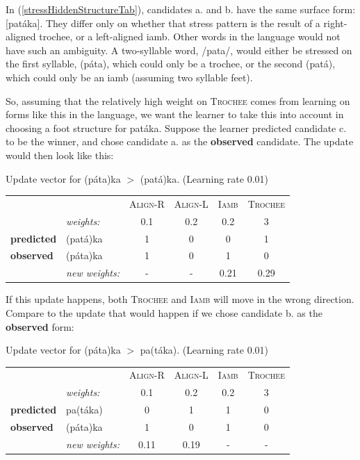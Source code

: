 \documentclass[12]{article}
\begin{document}
	In (\ref{stressHiddenStructureTab}), candidates a. and b. have the same surface form: [pat\'{a}ka].  They differ only on whether that stress pattern is the result of a right-aligned trochee, or a left-aligned iamb.  Other words in the language would not have such an ambiguity.  A two-syllable word, /pata/, would either be stressed on the first syllable, (p\'ata), which could only be a trochee, or the second (pat\'a), which could only be an iamb (assuming two syllable feet).
	
	So, assuming that the relatively high weight on \textsc{Trochee} comes from learning on forms like this in the language, we want the learner to take this into account in choosing a foot structure for pat\'aka.  Suppose the learner predicted candidate c. to be the winner, and chose candidate a. as the {\bf observed} candidate.  The update would then look like this:
	
	\begin{exe}
		\ex\label{stressWrongUpdate} Update vector for (p\'ata)ka $>$ (pat\'a)ka.  (Learning rate 0.01)
		
		\begin{tabular}{ll|cccc}
  		 &                  &\textsc{Align-R} 	& \textsc{Align-L} 	& \textsc{Iamb}	& \textsc{Trochee} \\
  		 &  {\it weights:} 	&		0.1			&		0.2			&		0.2		&		3			\\
  		 \hline
{\bf predicted}	& (pat\'a)ka &		1			&		0			&		0		&		1			\\
{\bf observed}	& (p\'ata)ka &		1			&		0			&		1		&		0			\\
		\hline
		 & {\it new weights:}&		-			&		-			&		0.21	&		0.29		\\
		\end{tabular}
		
	\end{exe}
	

If this update happens, both \textsc{Trochee} and \textsc{Iamb} will move in the wrong direction.  Compare to the update that would happen if we chose candidate b. as the {\bf observed} form:
  	
  	
	\begin{exe}
	\ex\label{stressRightUpdate} Update vector for (p\'ata)ka $>$ pa(t\'aka).  (Learning rate 0.01)
	
	\begin{tabular}{ll|cccc}
		&                  &\textsc{Align-R} 	& \textsc{Align-L} 	& \textsc{Iamb}	& \textsc{Trochee} \\
		&  {\it weights:} 	&		0.1			&		0.2			&		0.2		&		3			\\
		\hline
{\bf predicted}	& pa(t\'aka) &		0			&		1			&		1		&		0			\\
{\bf observed}	& (p\'ata)ka &		1			&		0			&		1		&		0			\\
		\hline
& {\it new weights:} 		 &		0.11		&		0.19		&		- 		&		-			\\
	\end{tabular}
	
\end{exe}
\end{document}
